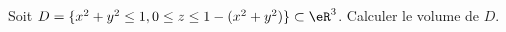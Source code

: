 \begin{exercice}\label{exoIntegralesMultiples0004}

Soit $D=\{x^2+y^2\le 1, 0\le z\le 1-(x^2+y^2)\}\subset\eR^3$. Calculer le volume de $D$.

\end{exercice}
